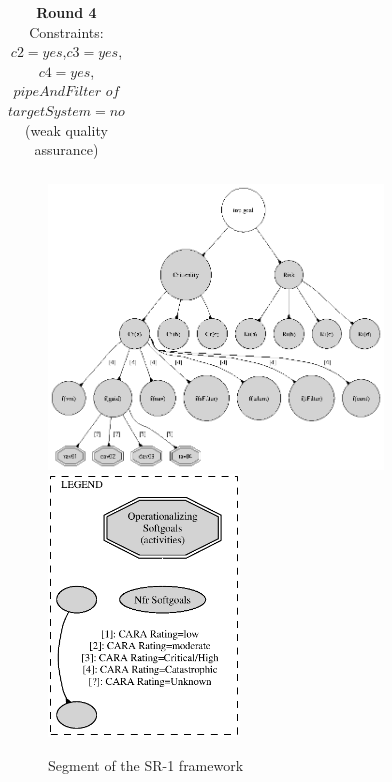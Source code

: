 \documentclass[twocolumn]{styles/IEEEtran}
\begin{document}
\begin{table}[h]
\begin{footnotesize}
\begin{center}
\begin{tabular}[t]{|c|c@{ }c@{ }c@{ }c@{ }c@{ }c|c|}
 \end{tabular}
 \end{center}
 \end{footnotesize}
 \caption{\textbf{Round 4} Constraints: $c2=yes$,$c3=yes$,$c4=yes$, $pipeAndFilter$ $of$ $targetSystem=no$  (weak quality assurance)}
 \label{arch_def_loose_worse4_4}

 \end{table}

%

\begin{figure}[h]
\begin{center}
\includegraphics[width=3.5in]{fig/cara_analysis.ps}
\includegraphics[width=2in]{fig/test.ps}
\end{center}
\caption{Segment of the SR-1 framework}
\label{fig:cara_analysis_graph}
\end{figure}
\end{document}
